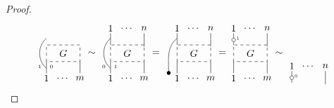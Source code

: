 \begin{proof}
\begin{equation*}
{\begin{tikzpicture}[scale=.6]
		\draw [dashed] (0,0) rectangle (2,1); \node at (1, .5) {$G$};
		
		\draw (0,-.4)  to[out=140,in=-140]  (0,1.4);
		\node at (0,-1) {$1$}; \draw (0,-.7) -- (0,0);
		\node at (1,-1) {$\dots$};
		\node at (2,-1) {$m$}; \draw (2,-.7) -- (2,0);
		
		\node at (-.4,-.3){$\scriptscriptstyle{1}$};
		\node at (.3,-.3){$\scriptscriptstyle{0}$};
		
		\node at (2.7,.5) {$\sim$}; 
		\end{tikzpicture}
		\begin{tikzpicture}[scale=.6]
		\node at (0,2) {$1$}; \draw (0,1.7) -- (0,1);
		\node at (1,2) {$\dots$};
		\node at (2,2) {$n$}; \draw (2,1.7) -- (2,.9);
		
		\draw [dashed] (0,0) rectangle (2,1); \node at (1, .5) {$G$};
		
		\draw (0,-.4)  to[out=140,in=-140]  (0,1.4);
		\node at (0,-1) {$1$}; \draw (0,-.7) -- (0,0);
		\node at (1,-1) {$\dots$};
		\node at (2,-1) {$m$}; \draw (2,-.7) -- (2,0);
		
		\node at (-.4,-.3){$\scriptscriptstyle{0}$};
		\node at (.3,-.3){$\scriptscriptstyle{1}$};
		
		\node at (2.7,.5) {$=$}; 
		\end{tikzpicture}
		\begin{tikzpicture}[scale=.6]
		\node at (0,2) {$1$}; \draw (0,1.7) -- (0,1);
		\node at (1,2) {$\dots$};
		\node at (2,2) {$n$}; \draw (2,1.7) -- (2,.9);
		
		\draw [dashed] (0,0) rectangle (2,1); \node at (1, .5) {$G$};
		
		\node at (-.5,-.7) {$\bullet$}; \draw (-.5,-.7)  to[out=90,in=-140]  (0,1.4);
		\node at (0,-1) {$1$}; \draw (0,-.7) -- (0,0);
		\node at (1,-1) {$\dots$};
		\node at (2,-1) {$m$}; \draw (2,-.7) -- (2,0);
		\node at (2.7,.5) {$=$}; 
		\end{tikzpicture}
		\!
		\begin{tikzpicture}[scale=.6]
		\node at (0,2) {$1$}; \draw (0,1.7) -- (0,1);
		\draw [fill=white] (0,1.3) circle [radius=0.11];
		\node at (.25,1.4)[scale = .5]{$1$};
		\node at (1,2) {$\dots$};
		\node at (2,2) {$n$}; \draw (2,1.7) -- (2,.9);
		
		\draw [dashed] (0,0) rectangle (2,1); \node at (1, .5) {$G$};
		
		\node at (0,-1) {$1$}; \draw (0,-.7) -- (0,0);
		\node at (1,-1) {$\dots$};
		\node at (2,-1) {$m$}; \draw (2,-.7) -- (2,0);
		\node at (2.7,.5) {$\sim$}; 
		\end{tikzpicture}
		\begin{tikzpicture}[scale=.6]
		\node at (0,2) {$1$}; \draw (0,1.7) -- (0,1);
		\draw [fill=white] (0,1.3) circle [radius=0.11];
		\node at (.25,1.4)[scale = .5]{$0$};
		\node at (1,2) {$\dots$};
		\node at (2,2) {$n$}; \draw (2,1.7) -- (2,.9);
		

\end{tikzpicture}}
\end{equation*}
\end{proof}
